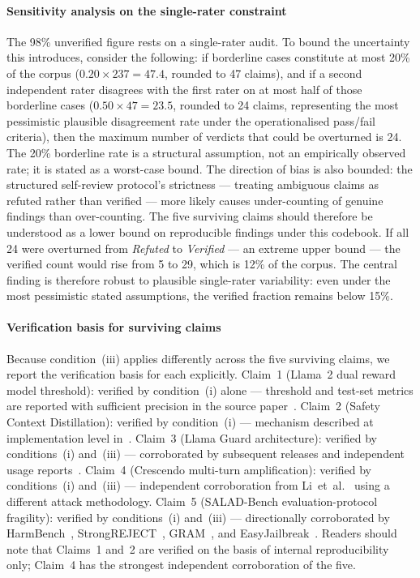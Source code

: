 \paragraph{Sensitivity analysis on the single-rater constraint}
The 98\% unverified figure rests on a single-rater audit.
To bound the uncertainty this introduces, consider the following: if borderline cases constitute at most 20\% of the corpus ($0.20 \times 237 = 47.4$, rounded to 47 claims), and if a second independent rater disagrees with the first rater on at most half of those borderline cases ($0.50 \times 47 = 23.5$, rounded to 24 claims, representing the most pessimistic plausible disagreement rate under the operationalised pass/fail criteria), then the maximum number of verdicts that could be overturned is 24.
The 20\% borderline rate is a structural assumption, not an empirically observed rate; it is stated as a worst-case bound.
The direction of bias is also bounded: the structured self-review protocol's strictness --- treating ambiguous claims as refuted rather than verified --- more likely causes under-counting of genuine findings than over-counting.
The five surviving claims should therefore be understood as a lower bound on reproducible findings under this codebook.
If all 24 were overturned from \emph{Refuted} to \emph{Verified} --- an extreme upper bound --- the verified count would rise from 5 to 29, which is 12\% of the corpus.
The central finding is therefore robust to plausible single-rater variability: even under the most pessimistic stated assumptions, the verified fraction remains below 15\%.

\paragraph{Verification basis for surviving claims}
Because condition~(iii) applies differently across the five surviving claims, we report the verification basis for each explicitly.
Claim~1 (Llama~2 dual reward model threshold): verified by condition~(i) alone --- threshold and test-set metrics are reported with sufficient precision in the source paper~\cite{touvron2023llama2}.
Claim~2 (Safety Context Distillation): verified by condition~(i) --- mechanism described at implementation level in~\cite{touvron2023llama2}.
Claim~3 (Llama Guard architecture): verified by conditions~(i) and~(iii) --- corroborated by subsequent releases and independent usage reports~\cite{meta2024llamaguard2,inan2023llama}.
Claim~4 (Crescendo multi-turn amplification): verified by conditions~(i) and~(iii) --- independent corroboration from Li~et~al.~\cite{li2024llm} using a different attack methodology.
Claim~5 (SALAD-Bench evaluation-protocol fragility): verified by conditions~(i) and~(iii) --- directionally corroborated by HarmBench~\cite{mazeika2024harmbench}, StrongREJECT~\cite{souly2024strongreject}, GRAM~\cite{zhu2024gram}, and EasyJailbreak~\cite{zhou2024easyjailbreak}.
Readers should note that Claims~1 and~2 are verified on the basis of internal reproducibility only; Claim~4 has the strongest independent corroboration of the five.

